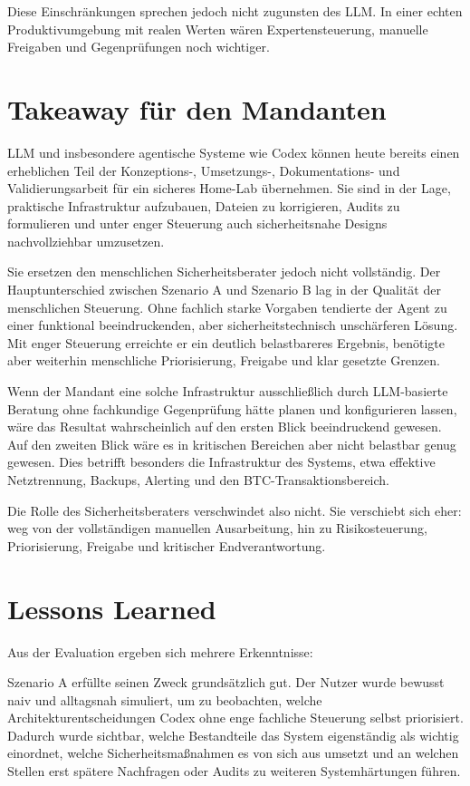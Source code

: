 {Diese Einschränkungen sprechen jedoch nicht zugunsten des \ac{LLM}. In einer echten Produktivumgebung mit realen Werten wären Expertensteuerung, manuelle Freigaben und Gegenprüfungen noch wichtiger.

\section{Takeaway für den Mandanten}

\acs{LLM} und insbesondere agentische Systeme wie Codex können heute bereits einen erheblichen Teil der Konzeptions-, Umsetzungs-, Dokumentations- und Validierungsarbeit für ein sicheres Home-Lab übernehmen. Sie sind in der Lage, praktische Infrastruktur aufzubauen, Dateien zu korrigieren, Audits zu formulieren und unter enger Steuerung auch sicherheitsnahe Designs nachvollziehbar umzusetzen.\cite{openaiCodexDocs,openaiShellTool}

Sie ersetzen den menschlichen Sicherheitsberater jedoch nicht vollständig. Der Hauptunterschied zwischen Szenario A und Szenario B lag in der Qualität der menschlichen Steuerung. Ohne fachlich starke Vorgaben tendierte der Agent zu einer funktional beeindruckenden, aber sicherheitstechnisch unschärferen Lösung. Mit enger Steuerung erreichte er ein deutlich belastbareres Ergebnis, benötigte aber weiterhin menschliche Priorisierung, Freigabe und klar gesetzte Grenzen.

Wenn der Mandant eine solche Infrastruktur ausschließlich durch \ac{LLM}-basierte Beratung ohne fachkundige Gegenprüfung hätte planen und konfigurieren lassen, wäre das Resultat wahrscheinlich auf den ersten Blick beeindruckend gewesen. Auf den zweiten Blick wäre es in kritischen Bereichen aber nicht belastbar genug gewesen. Dies betrifft besonders die Infrastruktur des Systems, etwa effektive Netztrennung, Backups, Alerting und den \ac{BTC}-Transaktionsbereich.

Die Rolle des Sicherheitsberaters verschwindet also nicht. Sie verschiebt sich eher: weg von der vollständigen manuellen Ausarbeitung, hin zu Risikosteuerung, Priorisierung, Freigabe und kritischer Endverantwortung.

\section{Lessons Learned}

Aus der Evaluation ergeben sich mehrere Erkenntnisse:

Szenario A erfüllte seinen Zweck grundsätzlich gut. Der Nutzer wurde bewusst naiv und alltagsnah simuliert, um zu beobachten, welche Architekturentscheidungen Codex ohne enge fachliche Steuerung selbst priorisiert. Dadurch wurde sichtbar, welche Bestandteile das System eigenständig als wichtig einordnet, welche Sicherheitsmaßnahmen es von sich aus umsetzt und an welchen Stellen erst spätere Nachfragen oder Audits zu weiteren Systemhärtungen führen. 

}
